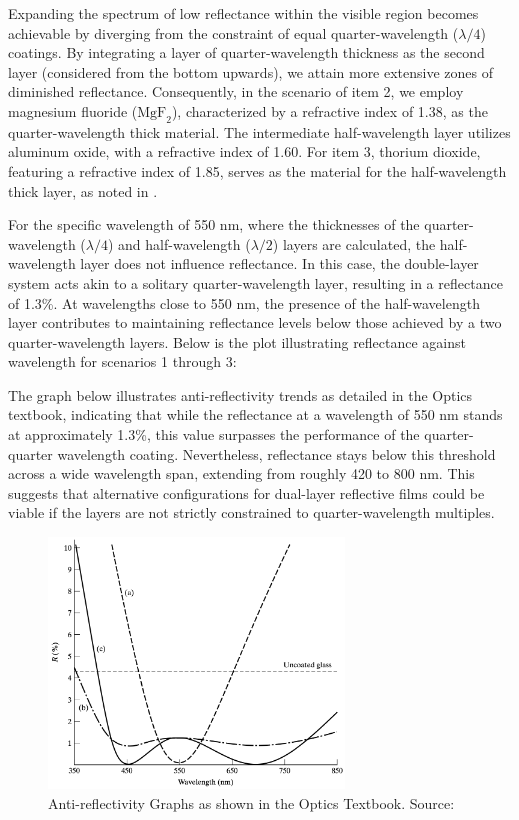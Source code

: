 Expanding the spectrum of low reflectance within the visible region becomes achievable by diverging from the constraint of equal quarter-wavelength ($\lambda/4$) coatings. By integrating a layer of quarter-wavelength thickness as the second layer (considered from the bottom upwards), we attain more extensive zones of diminished reflectance. Consequently, in the scenario of item 2, we employ magnesium fluoride ($\text{MgF}_2$), characterized by a refractive index of 1.38, as the quarter-wavelength thick material. The intermediate half-wavelength layer utilizes aluminum oxide, with a refractive index of 1.60. For item 3, thorium dioxide, featuring a refractive index of 1.85, serves as the material for the half-wavelength thick layer, as noted in \cite{pedrotti_introduction_2007}.

For the specific wavelength of 550 nm, where the thicknesses of the quarter-wavelength ($\lambda/4$) and half-wavelength ($\lambda/2$) layers are calculated, the half-wavelength layer does not influence reflectance. In this case, the double-layer system acts akin to a solitary quarter-wavelength layer, resulting in a reflectance of 1.3\%. At wavelengths close to 550 nm, the presence of the half-wavelength layer contributes to maintaining reflectance levels below those achieved by a two quarter-wavelength layers. Below is the plot illustrating reflectance against wavelength for scenarios 1 through 3:

The graph below illustrates anti-reflectivity trends as detailed in the Optics textbook, indicating that while the reflectance at a wavelength of 550 nm stands at approximately 1.3\%, this value surpasses the performance of the quarter-quarter wavelength coating. Nevertheless, reflectance stays below this threshold across a wide wavelength span, extending from roughly 420 to 800 nm. This suggests that alternative configurations for dual-layer reflective films could be viable if the layers are not strictly constrained to quarter-wavelength multiples.

\begin{figure}[H]
  \centering
  \includegraphics[width=0.7\textwidth]{Chapters/Figures/Chapter 4 Figures/Antireflectivity Graphs in the Optics Book.png}
  \caption{Anti-reflectivity Graphs as shown in the Optics Textbook. Source: \cite{pedrotti_introduction_2007}}
  \label{fig:antireflectivity graphs in the Optics book}
\end{figure}

